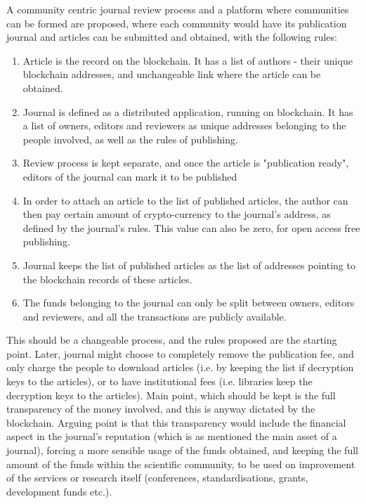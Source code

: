 \documentclass[12pt, a4paper]{article}
\begin{document}
A community centric journal review process and a platform where communities can be formed are proposed, where each community would have its publication journal and articles can be submitted and obtained, with the following rules:
\begin{enumerate}
	\item Article is the record on the blockchain. It has a list of authors - their unique blockchain addresses, and unchangeable link where the article can be obtained.
	\item Journal is defined as a distributed application, running on blockchain. It has a list of owners, editors and reviewers as unique addresses belonging to the people involved, as well as the rules of publishing.
	\item Review process is kept separate, and once the article is "publication ready", editors of the journal can mark it to be published
	\item In order to attach an article to the list of published articles, the author can then pay certain amount of crypto-currency to the journal's address, as defined by the journal's rules. This value can also be zero, for open access free publishing.
	\item Journal keeps the list of published articles as the list of addresses pointing to the blockchain records of these articles.
	\item The funds belonging to the journal can only be split between owners, editors and reviewers, and all the transactions are publicly available.
\end{enumerate}

This should be a changeable process, and the rules proposed are the starting point. Later, journal might choose to completely remove the publication fee, and only charge the people to download articles (i.e. by keeping the list if decryption keys to the articles), or to have institutional fees (i.e. libraries keep the decryption keys to the articles). Main point, which should be kept is the full transparency of the money involved, and this is anyway dictated by the blockchain. Arguing point is that this transparency would include the financial aspect in the journal's reputation (which is as mentioned the main asset of a journal), forcing a more sensible usage of the funds obtained, and keeping the full amount of the funds within the scientific community, to be used on improvement of the services or research itself (conferences, standardisations, grants, development funds etc.).
\end{document}
